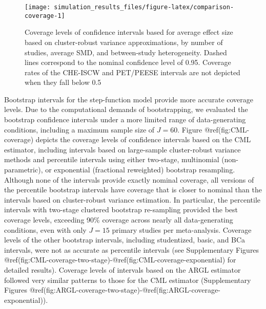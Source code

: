 \documentclass[
]{article}
\begin{document}
\begin{sidewaysfigure}
\texttt{[image: simulation\_results\_files/figure-latex/comparison-coverage-1]} \caption{Coverage levels of confidence intervals based for average effect size based on cluster-robust variance approximations, by number of studies, average SMD, and between-study heterogeneity. Dashed lines correspond to the nominal confidence level of 0.95. Coverage rates of the CHE-ISCW and PET/PEESE intervals are not depicted when they fall below 0.5}\label{fig:comparison-coverage}
\end{sidewaysfigure}

Bootstrap intervals for the step-function model provide more accurate
coverage levels. Due to the computational demands of bootstrapping, we
evaluated the bootstrap confidence intervals under a more limited range
of data-generating conditions, including a maximum sample size of
\(J = 60\). Figure @ref(fig:CML-coverage) depicts the coverage levels of
confidence intervals based on the CML estimator, including intervals
based on large-sample cluster-robust variance methods and percentile
intervals using either two-stage, multinomial (non-parametric), or
exponential (fractional reweighted) bootstrap resampling. Although none
of the intervals provide exactly nominal coverage, all versions of the
percentile bootstrap intervals have coverage that is closer to nominal
than the intervals based on cluster-robust variance estimation. In
particular, the percentile intervals with two-stage clustered bootstrap
re-sampling provided the best coverage levels, exceeding 90\% coverage
across nearly all data-generating conditions, even with only \(J = 15\)
primary studies per meta-analysis. Coverage levels of the other
bootstrap intervals, including studentized, basic, and BCa intervals,
were not as accurate as percentile intervals (see Supplementary Figures
@ref(fig:CML-coverage-two-stage)-@ref(fig:CML-coverage-exponential) for
detailed results). Coverage levels of intervals based on the ARGL
estimator followed very similar patterns to those for the CML estimator
(Supplementary Figures
@ref(fig:ARGL-coverage-two-stage)-@ref(fig:ARGL-coverage-exponential)).
\end{document}
